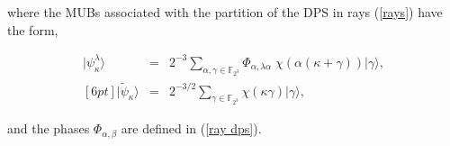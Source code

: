 \documentclass[quantumrep,article,submit,pdftex,moreauthors]{Definitions/mdpi}
\DeclareMathOperator{\tr}{tr}
\begin{document}
where the MUBs associated with the partition of the DPS in rays (\ref{rays})
have the form,

\begin{eqnarray}
  |\psi_{\kappa }^{\lambda }\rangle
  &=& 2^{-3} \sum_{\alpha,\gamma \in \mathbb{F}_{2^{3}}}
  \Phi_{\alpha,\lambda \alpha} \;
  \chi\left( \alpha(\kappa+\gamma) \right) 
  |\gamma \rangle, \\ [6pt]
  |\tilde{\psi}_{\kappa }\rangle
  &=& 2^{-3 / 2} \sum_{\gamma \in \mathbb{F}_{2^{3}}}
  \chi\left( \kappa\gamma \right) 
  |\gamma \rangle,
\end{eqnarray}

and the phases $\Phi_{\alpha,\beta}$ are defined in (\ref{ray dps}).

\color{black}
\end{document}
